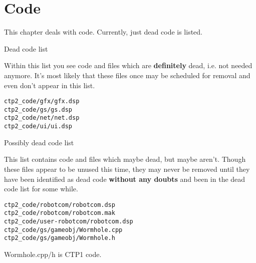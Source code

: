 \chapter{Code\label{cha:code}}
This chapter deals with code. Currently, just dead code is listed.
\begin{section}{Dead code list}

Within this list you see code and files which are \textbf{definitely} dead, i.e. not needed anymore. It's most likely that these files once may be scheduled for removal and even don't appear in this list.

\begin{verbatim}
ctp2_code/gfx/gfx.dsp
ctp2_code/gs/gs.dsp
ctp2_code/net/net.dsp
ctp2_code/ui/ui.dsp
\end{verbatim}

\end{section}%

\begin{section}{Possibly dead code list}

This list contains code and files which maybe dead, but maybe aren't. Though these files appear to be unused this time, they may never be removed until they have been identified as dead code \textbf{without any doubts} and been in the dead code list for some while.

\begin{verbatim}
ctp2_code/robotcom/robotcom.dsp
ctp2_code/robotcom/robotcom.mak
ctp2_code/user-robotcom/robotcom.dsp
ctp2_code/gs/gameobj/Wormhole.cpp
ctp2_code/gs/gameobj/Wormhole.h
\end{verbatim}

Wormhole.cpp/h is CTP1 code.

\end{section}%
